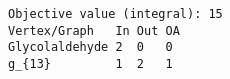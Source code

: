 \begin{verbatim}
Objective value (integral): 15
Vertex/Graph   In Out OA 
Glycolaldehyde 2  0   0  
g_{13}         1  2   1  
\end{verbatim}
